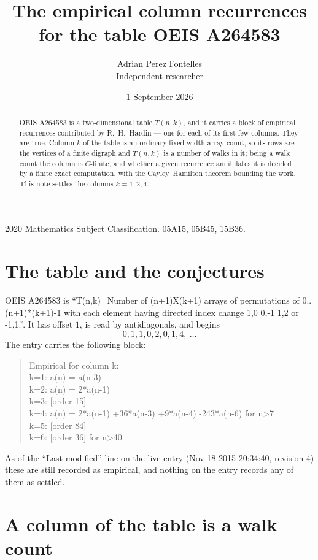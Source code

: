 \documentclass[11pt,a4paper]{article}
\title{The empirical column recurrences for the table OEIS A264583}
\author{Adrian Perez Fontelles\\ \small Independent researcher}
\date{1 September 2026}
\theoremstyle{plain}
\theoremstyle{definition}
\begin{document}
\maketitle

\begin{abstract}
OEIS A264583 is a two-dimensional table $T(n,k)$, and it carries a block of empirical
recurrences contributed by R.~H.~Hardin --- one for each of its first few columns. They are
true. Column $k$ of the table is an ordinary fixed-width array count, so its rows are the
vertices of a finite digraph and $T(n,k)$ is a number of walks in it; being a walk count the
column is $C$-finite, and whether a given recurrence annihilates it is decided by a finite
exact computation, with the Cayley--Hamilton theorem bounding the work. This note settles the columns $k=1, 2, 4$.
\end{abstract}

\noindent\small 2020 Mathematics Subject Classification. 05A15, 05B45, 15B36.\normalsize

\section{The table and the conjectures}

OEIS A264583 is ``T(n,k)=Number of (n+1)X(k+1) arrays of permutations of 0..(n+1)*(k+1)-1 with each element having directed index change 1,0 0,-1 1,2 or -1,1.''. It has offset $1$, is
read by antidiagonals, and begins
\[
0, 1, 1, 0, 2, 0, 1, 4,\ \dots
\]
The entry carries the following block:
\begin{quote}\small
Empirical for column k:\\
k=1: a(n) = a(n-3)\\
k=2: a(n) = 2*a(n-1)\\
k=3: [order 15]\\
k=4: a(n) = 2*a(n-1) +36*a(n-3) +9*a(n-4) -243*a(n-6) for n>7\\
k=5: [order 84]\\
k=6: [order 36] for n>40\\
\end{quote}
As of the ``Last modified'' line on the live entry (Nov 18 2015 20:34:40, revision 4) these are still
recorded as empirical, and nothing on the entry records any of them as settled.

\section{A column of the table is a walk count}
\end{document}
